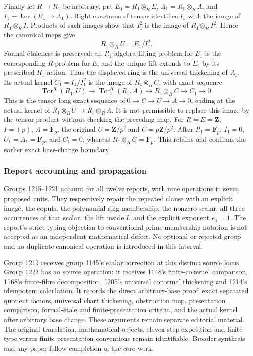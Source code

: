 Finally let \(R\to R_1\) be arbitrary, put \(E_1=R_1\otimes_RE\), \(A_1=R_1\otimes_RA\), and \(I_1=\ker(E_1\to A_1)\). Right exactness of tensor identifies \(I_1\) with the image of \(R_1\otimes_R I\). Products of such images show that \(I_1^2\) is the image of \(R_1\otimes_R I^2\). Hence the canonical maps give \[
R_1\otimes_R U=E_1/I_1^2.
\] Formal étaleness is preserved: an \(R_1\)-algebra lifting problem for \(E_1\) is the corresponding \(R\)-problem for \(E\), and the unique lift extends to \(E_1\) by its prescribed \(R_1\)-action. Thus the displayed ring is the universal thickening of \(A_1\). Its actual kernel \(C_1=I_1/I_1^2\) is the image of \(R_1\otimes_R C\), with exact sequence \[
\operatorname{Tor}_1^R(R_1,U)\longrightarrow
\operatorname{Tor}_1^R(R_1,A)\longrightarrow
R_1\otimes_R C\longrightarrow C_1\longrightarrow0.
\] This is the tensor long exact sequence of \(0\to C\to U\to A\to0\), ending at the actual kernel of \(R_1\otimes_R U\to R_1\otimes_R A\). It is not permissible to replace this image by the tensor product without checking the preceding map. For \(R=E=\mathbf Z\), \(I=(p)\), \(A=\mathbf F_p\), the original \(U=\mathbf Z/p^2\) and \(C=p\mathbf Z/p^2\). After \(R_1=\mathbf F_p\), \(I_1=0\), \(U_1=A_1=\mathbf F_p\), and \(C_1=0\), whereas \(R_1\otimes_R C=\mathbf F_p\). This retains and confirms the earlier exact base-change boundary.

\subsubsection{Report accounting and propagation}\label{report-accounting-and-propagation}

Groups 1215--1221 account for all twelve reports, with nine operations in seven proposed units. They respectively repair the repeated clause with an explicit image, the copula, the polynomial-ring membership, the nonzero scalar, all three occurrences of that scalar, the lift inside \(I\), and the explicit exponent \(e_1=1\). The report's strict typing objection to conventional prime-membership notation is not accepted as an independent mathematical defect. No optional or rejected group and no duplicate canonical operation is introduced in this interval.

Group 1219 receives group 1145's scalar correction at this distinct source locus. Group 1222 has no source operation: it receives 1148's finite-cokernel comparison, 1168's finite-fibre decomposition, 1205's universal conormal thickening and 1214's idempotent calculation. It records the direct arbitrary-base proof, exact separated quotient factors, universal chart thickening, obstruction map, presentation comparison, formal-étale and finite-presentation criteria, and the actual kernel after arbitrary base change. These arguments remain separate editorial material. The original translation, mathematical objects, eleven-step exposition and finite-type versus finite-presentation conventions remain identifiable. Broader synthesis and any paper follow completion of the core work.
